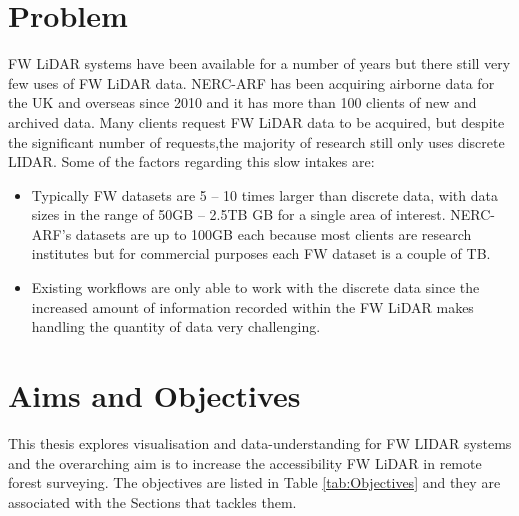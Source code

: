 \documentclass{subfiles}
\begin{document}
\section{Problem}\label{sec:Problem}
\par FW LiDAR systems have been available for a number of years but there still very few uses of FW LiDAR data. NERC-ARF has been acquiring airborne data for the UK and overseas since 2010 and it has more than 100 clients of new and archived data. Many clients request FW LiDAR data to be acquired, but despite the significant number of requests,the majority of research still only uses discrete LIDAR. Some of the factors regarding this slow intakes are:
\begin{itemize}
	\item Typically FW datasets are 5 – 10 times larger than discrete data, with data sizes in the range of 50GB – 2.5TB GB for a single area of interest. NERC-ARF's datasets are up to 100GB each because most clients are research institutes but for commercial purposes each FW dataset is a couple of TB.
	\item Existing workflows are only able to work with the discrete data since the increased amount of information recorded within the FW LiDAR makes handling the quantity of data very challenging.
\end{itemize}

\newpage

\section {Aims and Objectives}\label{sec:AimsObjectives}

\par This thesis explores visualisation and data-understanding for FW LIDAR systems and the overarching aim is to increase the accessibility FW LiDAR in remote forest surveying. {\color{blue}The objectives are listed in Table \ref{tab:Objectives} and they are associated with the Sections that tackles them.}
\end{document}
